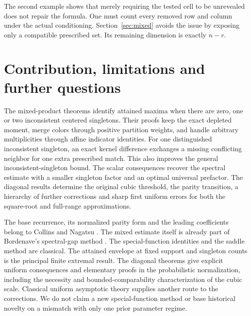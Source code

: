 \documentclass[11pt]{article}
\theoremstyle{definition}
\theoremstyle{remark}
\newcommand{\1}{\mathbf 1}
\begin{document}
The second example shows that merely requiring the tested cell to be unrevealed does not repair the formula. One must count every removed row and column under the actual conditioning. Section~\ref{sec:mixed} avoids the issue by exposing only a compatible prescribed set. Its remaining dimension is exactly $n-r$.


\section{Contribution, limitations and further questions}

The mixed-product theorems identify attained maxima when there are zero, one or two inconsistent centered singletons. Their proofs keep the exact depleted moment, merge colors through positive partition weights, and handle arbitrary multiplicities through affine indicator identities. For one distinguished inconsistent singleton, an exact kernel difference exchanges a missing conflicting neighbor for one extra prescribed match. This also improves the general inconsistent-singleton bound. The scalar consequences recover the spectral estimate with a smaller singleton factor and an optimal universal prefactor. The diagonal results determine the original cubic threshold, the parity transition, a hierarchy of further corrections and sharp first uniform errors for both the square-root and full-range approximations.

The base recurrence, its normalized parity form and the leading coefficients belong to Collins and Nagatsu \cite{CN}. The mixed estimate itself is already part of Bordenave's spectral-gap method \cite{Bordenave}. The special-function identities and the saddle method are classical. The attained envelope at fixed support and singleton counts is the principal finite extremal result. The diagonal theorems give explicit uniform consequences and elementary proofs in the probabilistic normalization, including the necessity and bounded-comparability characterization of the cubic scale. Classical uniform asymptotic theory supplies another route to the corrections. We do not claim a new special-function method or base historical novelty on a mismatch with only one prior parameter regime.
\end{document}
